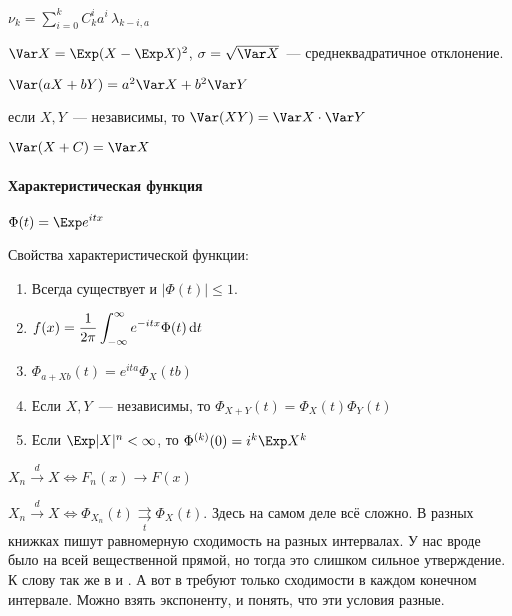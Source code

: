 \documentclass[12pt,timbord]{../../../notes}
\begin{document}
{\prop\label{prop:prob::moments::conn} $\displaystyle\nu_k=\sum_{i=0}^k C_k^i a^i \,\lambda_{k-i,a}$}

\begin{defn}[Дисперсия]\label{defn:prob::moments::var}
  $\Var X = \Exp (X-\Exp X)^2$, $\sigma = \sqrt{\Var X}$~--- среднеквадратичное отклонение.
\end{defn}

\begin{prop}\label{prop:prob::moments::varprop}
  \item $\Var(a X + b Y) = a^2 \Var X + b^2 \Var Y$
  \item если $X,Y$~--- независимы, то $\Var (XY) = \Var X \cdot \Var Y$
  \item $\Var(X+C) = \Var X$
\end{prop}

\paragraph{Характеристическая функция}
\label{par:prop::charfun}

\begin{defn}\label{defn:prob::moments::charfun}
  $\displaystyle \Phi(t) = \Exp e^{itx}$
\end{defn}

\begin{prop}\label{prop:prob::charfun::charfun}
  Свойства характеристической функции:
  \begin{enumerate}
    \item Всегда существует и $|\Phi(t)| \leqslant 1$.
    \item $f(x) = \dfrac{1}{2\pi} \displaystyle\int_{-\infty}^\infty e^{-itx} \Phi(t) \,\mathrm{d} t $
    \item $\Phi_{a + Xb} (t) = e^{ita} \Phi_X (tb)$
    \item Если $X,Y$~--- независимы, то $\Phi_{X+Y}(t)=  \Phi_X(t) \Phi_Y(t)$
    \item Если $\Exp |X|^n < \infty$, то $\Phi^{(k)}(0)=  i^k \Exp X^k$
  \end{enumerate}
\end{prop}
\begin{defn}\label{defn:prob::charfun::distconv}
  $X_n \xrightarrow{d} X \Leftrightarrow F_n(x) \to F(x)$ 
\end{defn}
\begin{thrm}\label{thrm:prob::charfun::contchar}
  $X_n \xrightarrow{d} X \Leftrightarrow \Phi_{X_n} (t)
  \underset{t}{\rightrightarrows} \Phi_X(t)$.
  Здесь на самом деле всё сложно. В разных книжках пишут равномерную сходимость на разных
  интервалах. У нас вроде было на всей вещественной прямой, но тогда это слишком сильное
  утверждение. К слову так же в \cite{chernova} и \cite{shiriaev}. А вот в \cite{msu} требуют
  только сходимости в каждом конечном интервале. Можно взять экспоненту, и понять, что эти
  условия разные. 
\end{thrm}
\end{document}
